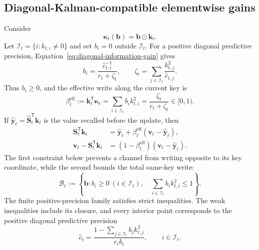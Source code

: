 \documentclass[11pt]{article}
\newcommand{\vct}[1]{\boldsymbol{#1}}
\newcommand{\tr}{\mathsf{T}}
\begin{document}
\subsection{Diagonal-Kalman-compatible elementwise gains}

Consider
\begin{equation}
  \vct{\kappa}_t(\vct{b})=\vct{b}\odot\vct{k}_t.
  \label{eq:elementwise-gain-family}
\end{equation}
Let $\mathcal I_t=\{i:k_{t,i}\neq0\}$ and set $b_i=0$ outside
$\mathcal I_t$.  For a positive diagonal predictive precision,
Equation~\eqref{eq:diagonal-information-gain} gives
\begin{equation}
  b_i
  =\frac{\widehat c_{t,i}^{-1}}{r_t+\zeta_t},
  \qquad
  \zeta_t
  =\sum_{j\in\mathcal I_t}\frac{k_{t,j}^2}{\widehat c_{t,j}}.
  \label{eq:kalman-channel-coefficient}
\end{equation}
Thus $b_i\geq0$, and the effective write along the current key is
\begin{equation}
  \beta_t^{\mathrm{eff}}
  :=\vct{k}_t^{\tr}\vct{\kappa}_t
  =\sum_{i\in\mathcal I_t}b_i k_{t,i}^2
  =\frac{\zeta_t}{r_t+\zeta_t}
  \in[0,1).
  \label{eq:effective-same-key-write}
\end{equation}
If $\widehat{\vct{y}}_t=\widehat{\vct{S}}_t^{\tr}\vct{k}_t$ is the value
recalled before the update, then
\begin{align}
  \vct{S}_t^{\tr}\vct{k}_t
  &=\widehat{\vct{y}}_t
    +\beta_t^{\mathrm{eff}}
      (\vct{v}_t-\widehat{\vct{y}}_t),
  \\
  \vct{v}_t-\vct{S}_t^{\tr}\vct{k}_t
  &=(1-\beta_t^{\mathrm{eff}})
    (\vct{v}_t-\widehat{\vct{y}}_t).
  \label{eq:same-key-residual-contraction}
\end{align}
The first constraint below prevents a channel from writing opposite to its key
coordinate, while the second bounds the total same-key write:
\begin{equation}
  \mathcal B_t
  :=\left\{\vct{b}:
  b_i\geq0\ (i\in\mathcal I_t),\quad
  \sum_{i\in\mathcal I_t}b_i k_{t,i}^2\leq1\right\}.
  \label{eq:diagonal-gain-constraints}
\end{equation}
The finite positive-precision family satisfies strict inequalities.  The weak
inequalities include its closure, and every interior point corresponds to the
positive diagonal predictive precision
\begin{equation}
  \widehat c_i
  =\frac{1-\sum_{j\in\mathcal I_t}b_jk_{t,j}^2}{r_tb_i},
  \qquad i\in\mathcal I_t.
  \label{eq:gain-to-diagonal-information}
\end{equation}
\end{document}
